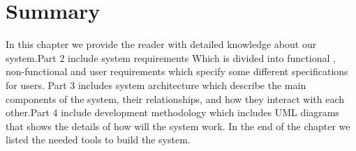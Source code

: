 \section{Summary}
 In this chapter we provide the reader with detailed knowledge about our system.Part 2 include system requirements Which is divided into functional , non-functional and user requirements which specify some different specifications for users. Part 3 includes system architecture which describe the main components of the system, their relationships, and how they interact with each other.Part 4 include development methodology which includes UML diagrams that shows the details of  how will the system work. In the end of the chapter we listed the needed tools to build the system.